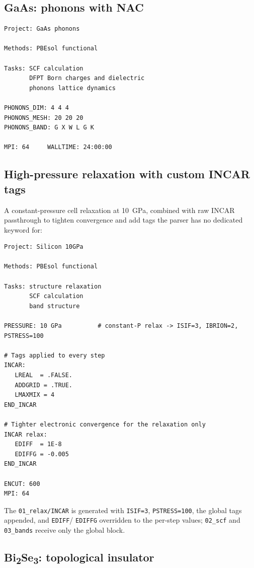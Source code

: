 \documentclass[11pt,a4paper]{scrartcl}
\begin{document}
\subsection{GaAs: phonons with NAC}
\label{sec:example-gaas-nac}

\begin{lstlisting}
Project: GaAs phonons

Methods: PBEsol functional

Tasks: SCF calculation
       DFPT Born charges and dielectric
       phonons lattice dynamics

PHONONS_DIM: 4 4 4
PHONONS_MESH: 20 20 20
PHONONS_BAND: G X W L G K

MPI: 64     WALLTIME: 24:00:00
\end{lstlisting}

\subsection{High-pressure relaxation with custom INCAR tags}
\label{sec:ex-pressure}

A constant-pressure cell relaxation at 10~GPa, combined with raw INCAR
passthrough to tighten convergence and add tags the parser has no
dedicated keyword for:

\begin{lstlisting}
Project: Silicon 10GPa

Methods: PBEsol functional

Tasks: structure relaxation
       SCF calculation
       band structure

PRESSURE: 10 GPa          # constant-P relax -> ISIF=3, IBRION=2, PSTRESS=100

# Tags applied to every step
INCAR:
   LREAL  = .FALSE.
   ADDGRID = .TRUE.
   LMAXMIX = 4
END_INCAR

# Tighter electronic convergence for the relaxation only
INCAR relax:
   EDIFF  = 1E-8
   EDIFFG = -0.005
END_INCAR

ENCUT: 600
MPI: 64
\end{lstlisting}

The \texttt{01\_relax/INCAR} is generated with \texttt{ISIF=3},
\texttt{PSTRESS=100}, the global tags appended, and \texttt{EDIFF}/%
\texttt{EDIFFG} overridden to the per-step values; \texttt{02\_scf} and
\texttt{03\_bands} receive only the global block.

\subsection{Bi\textsubscript{2}Se\textsubscript{3}: topological insulator}
\end{document}
